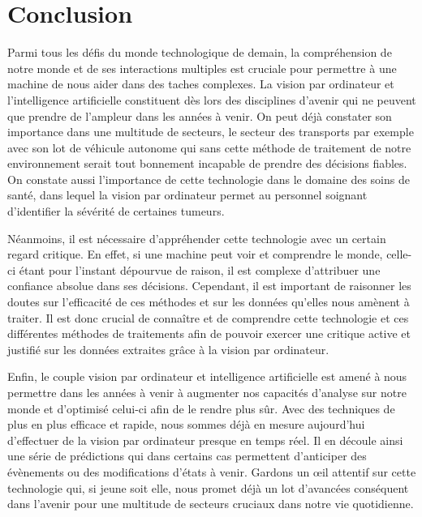 \documentclass[a4paper,12pt]{article} %
\begin{document}
\section{Conclusion} %
Parmi tous les défis du monde technologique de demain, la compréhension de notre monde et de ses interactions multiples est cruciale pour permettre à une machine de nous aider dans des taches complexes. La vision par ordinateur et l’intelligence artificielle constituent dès lors des disciplines d’avenir qui ne peuvent que prendre de l’ampleur dans les années à venir. On peut déjà constater son importance dans une multitude de secteurs, le secteur des transports par exemple avec son lot de véhicule autonome qui sans cette méthode de traitement de notre environnement serait tout bonnement incapable de prendre des décisions fiables. On constate aussi l’importance de cette technologie dans le domaine des soins de santé, dans lequel la vision par ordinateur permet au personnel soignant d’identifier la sévérité de certaines tumeurs. \newline
\par
	Néanmoins, il est nécessaire d’appréhender cette technologie avec un certain regard critique. En effet, si une machine peut voir et comprendre le monde, celle-ci étant pour l’instant dépourvue de raison, il est complexe d’attribuer une confiance absolue dans ses décisions. Cependant, il est important de raisonner les doutes sur l’efficacité de ces méthodes et sur les données qu’elles nous amènent à traiter. Il est donc crucial de connaître et de comprendre cette technologie et ces différentes méthodes de traitements afin de pouvoir exercer une critique active et justifié sur les données extraites grâce à la vision par ordinateur. \newline
\par
	Enfin, le couple vision par ordinateur et intelligence artificielle est amené à nous permettre dans les années à venir à augmenter nos capacités d’analyse sur notre monde et d’optimisé celui-ci afin de le rendre plus sûr. Avec des techniques de plus en plus efficace et rapide, nous sommes déjà en mesure aujourd’hui d’effectuer de la vision par ordinateur presque en temps réel. Il en découle ainsi une série de prédictions qui dans certains cas permettent d’anticiper des évènements ou des modifications d’états à venir. Gardons un œil attentif sur cette technologie qui, si jeune soit elle, nous promet déjà un lot d’avancées conséquent dans l’avenir pour une multitude de secteurs cruciaux dans notre vie quotidienne. 
\newpage

\nocite {*}

\end{document}
